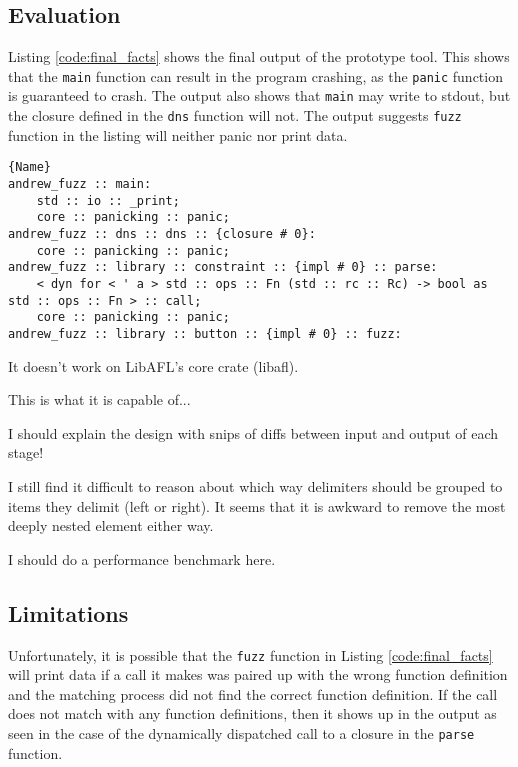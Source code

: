 \documentclass[11pt]{article}
\begin{document}
\subsection{Evaluation}

Listing \ref{code:final_facts} shows the final output of the prototype tool.
This shows that the \lstinline{main} function can result in the program crashing, as the \lstinline{panic} function is guaranteed to crash.
The output also shows that \lstinline{main} may write to stdout, but the closure defined in the \lstinline{dns} function will not.
The output suggests \lstinline{fuzz} function in the listing will neither panic nor print data.

\begin{lstlisting}[caption=External Function Annotions, label=code:final_facts]{Name}
andrew_fuzz :: main:
	std :: io :: _print;
	core :: panicking :: panic;
andrew_fuzz :: dns :: dns :: {closure # 0}:
	core :: panicking :: panic;
andrew_fuzz :: library :: constraint :: {impl # 0} :: parse:
	< dyn for < ' a > std :: ops :: Fn (std :: rc :: Rc) -> bool as std :: ops :: Fn > :: call;
	core :: panicking :: panic;
andrew_fuzz :: library :: button :: {impl # 0} :: fuzz:
\end{lstlisting}

It doesn't work on LibAFL's core crate (libafl).

This is what it is capable of...

I should explain the design with snips of diffs between input and output of each stage!

I still find it difficult to reason about which way delimiters should be grouped to items they delimit (left or right).
It seems that it is awkward to remove the most deeply nested element either way.

I should do a performance benchmark here.

\subsection{Limitations}

Unfortunately, it is possible that the \lstinline{fuzz} function in Listing \ref{code:final_facts} will print data if a call it makes was paired up with the wrong function definition and the matching process did not find the correct function definition.
If the call does not match with any function definitions, then it shows up in the output as seen in the case of the dynamically dispatched call to a closure in the \lstinline{parse} function.
\end{document}
